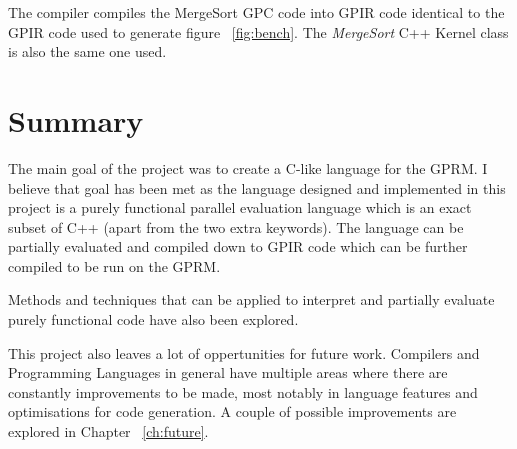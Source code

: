 The compiler compiles the MergeSort GPC code into GPIR code identical to the GPIR code used to generate figure ~\ref{fig:bench}.
The \textit{MergeSort} C++ Kernel class is also the same one used.

\section{Summary}
The main goal of the project was to create a C-like language for the GPRM.
I believe that goal has been met as the language designed and implemented 
in this project is a purely functional parallel evaluation language which is an exact subset of C++ 
(apart from the two extra keywords). The language can be partially evaluated and compiled down to GPIR code 
which can be further compiled to be run on the GPRM. 

Methods and techniques that can be applied to interpret and partially evaluate purely
functional code have also been explored.

This project also leaves a lot of oppertunities for future work. Compilers and Programming Languages in general have
multiple areas where there are constantly improvements to be made, most notably in language features and optimisations 
for code generation. A couple of possible improvements are explored in Chapter ~\ref{ch:future}.





